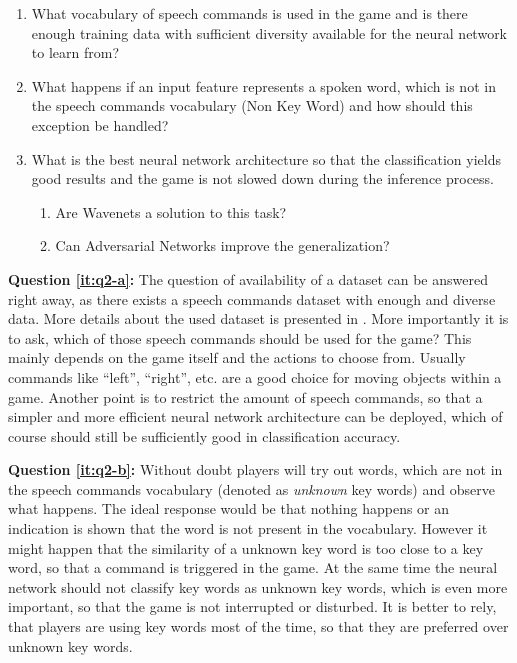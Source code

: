 \begin{enumerate}[label={Q.2.\alph*)}, leftmargin=1.75cm]
    \item What vocabulary of speech commands is used in the game and is there enough training data with sufficient diversity available for the neural network to learn from?
    \label{it:q2-a}
    
    \item What happens if an input feature represents a spoken word, which is not in the speech commands vocabulary (Non Key Word) and how should this exception be handled?
    \label{it:q2-b}
    
    \item What is the best neural network architecture so that the classification yields good results and the game is not slowed down during the inference process.
    \label{it:q2-c}
    \begin{enumerate}[label=(\roman*)]
        \item Are Wavenets a solution to this task? 
        \item Can Adversarial Networks improve the generalization?
    \end{enumerate}
    
\end{enumerate}
\noindent
\textbf{Question \ref{it:q2-a}:} The question of availability of a dataset can be answered right away, as there exists a speech commands dataset \cite{Warden2018} with enough and diverse data.
More details about the used dataset is presented in .
More importantly it is to ask, which of those speech commands should be used for the game?
This mainly depends on the game itself and the actions to choose from.
Usually commands like \enquote{left}, \enquote{right}, etc. are a good choice for moving objects within a game.
Another point is to restrict the amount of speech commands, so that a simpler and more efficient neural network architecture can be deployed, which of course should still be sufficiently good in classification accuracy.

\textbf{Question \ref{it:q2-b}:} Without doubt players will try out words, which are not in the speech commands vocabulary (denoted as \emph{unknown} key words) and observe what happens.
The ideal response would be that nothing happens or an indication is shown that the word is not present in the vocabulary. 
However it might happen that the similarity of a unknown key word is too close to a key word, so that a command is triggered in the game. 
At the same time the neural network should not classify key words as unknown key words, which is even more important, so that the game is not interrupted or disturbed.
It is better to rely, that players are using key words most of the time, so that they are preferred over unknown key words.

